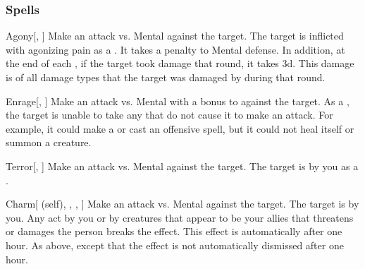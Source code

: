 \subsubsection{Spells}


\lowercase{\hypertarget{spell:Agony}{}}\label{spell:Agony}
\begin{freeability}[Rank 1]{\hypertarget{spell:Agony}{Agony}}[, ]
Make an attack vs. Mental against the target.
\hit The target is inflicted with agonizing pain as a .
It takes a  penalty to Mental defense.
In addition, at the end of each , if the target took damage that round, it takes  \minus3d.
This damage is of all damage types that the target was damaged by during that round.
\end{freeability}
\vspace{0.25em}



\lowercase{\hypertarget{spell:Enrage}{}}\label{spell:Enrage}
\begin{freeability}[Rank 1]{\hypertarget{spell:Enrage}{Enrage}}[, ]
Make an attack vs. Mental with a  bonus to  against the target.
\hit As a , the target is unable to take any  that do not cause it to make an attack.
For example, it could make a  or cast an offensive spell, but it could not heal itself or summon a creature.
\end{freeability}
\vspace{0.25em}



\lowercase{\hypertarget{spell:Terror}{}}\label{spell:Terror}
\begin{freeability}[Rank 1]{\hypertarget{spell:Terror}{Terror}}[, ]
Make an attack vs. Mental against the target.
\hit The target is \frightened by you as a .
\end{freeability}
\vspace{0.25em}



\lowercase{\hypertarget{spell:Charm}{}}\label{spell:Charm}
\begin{attuneability}[Rank 3]{\hypertarget{spell:Charm}{Charm}}[ (self), , , ]
Make an attack vs. Mental against the target.
\hit The target is \charmed by you.
Any act by you or by creatures that appear to be your allies that threatens or damages the  person breaks the effect.
This effect is automatically  after one hour.
\crit As above, except that the effect is not automatically dismissed after one hour.
\end{attuneability}
\vspace{0.25em}



